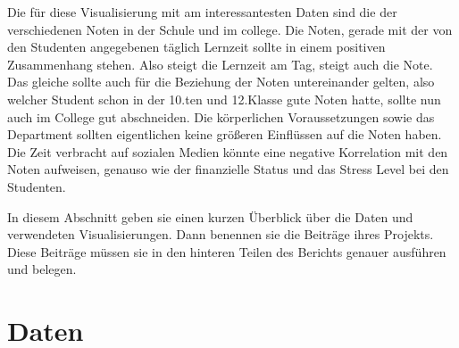 \documentclass[usegeometry=true]{scrartcl}
\begin{document}
\noindent Die für diese Visualisierung mit am interessantesten Daten sind die der verschiedenen Noten in der Schule und im college. Die Noten, gerade mit der von den Studenten angegebenen täglich Lernzeit sollte in einem positiven Zusammenhang stehen. Also steigt die Lernzeit am Tag, steigt auch die Note. Das gleiche sollte auch für die Beziehung der Noten untereinander gelten, also welcher Student schon in der 10.ten und 12.Klasse gute Noten hatte, sollte nun auch im College gut abschneiden. 
\noindent Die körperlichen Voraussetzungen sowie das Department sollten eigentlichen keine größeren Einflüssen auf die Noten haben.
\noindent Die Zeit verbracht auf sozialen Medien könnte eine negative Korrelation mit den Noten aufweisen, genauso wie der finanzielle Status und das Stress Level bei den Studenten.

In diesem Abschnitt geben sie einen kurzen Überblick über die Daten und verwendeten Visualisierungen. Dann benennen sie die Beiträge ihres Projekts. Diese Beiträge müssen sie in den hinteren Teilen des Berichts genauer ausführen und belegen.

\section{Daten}
\end{document}
